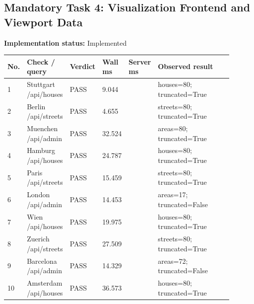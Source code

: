 \documentclass[10pt,a4paper]{article}
\begin{document}
\subsection{Mandatory Task 4: Visualization Frontend and Viewport Data}
\textbf{Implementation status:} Implemented\\
\scriptsize
\begin{longtable}{|P{0.045\linewidth}|P{0.19\linewidth}|P{0.105\linewidth}|P{0.085\linewidth}|P{0.085\linewidth}|P{0.385\linewidth}|}
\hline
\textbf{No.} & \textbf{Check / query} & \textbf{Verdict} & \textbf{Wall ms} & \textbf{Server ms} & \textbf{Observed result}\\ \hline
{} 1 & Stuttgart /api/houses & PASS & 9.044 &  & houses=80; truncated=True\\ \hline
{} 2 & Berlin /api/streets & PASS & 4.655 &  & streets=80; truncated=True\\ \hline
{} 3 & Muenchen /api/admin & PASS & 32.524 &  & areas=80; truncated=True\\ \hline
{} 4 & Hamburg /api/houses & PASS & 24.787 &  & houses=80; truncated=True\\ \hline
{} 5 & Paris /api/streets & PASS & 15.459 &  & streets=80; truncated=True\\ \hline
{} 6 & London /api/admin & PASS & 14.453 &  & areas=17; truncated=False\\ \hline
{} 7 & Wien /api/houses & PASS & 19.975 &  & houses=80; truncated=True\\ \hline
{} 8 & Zuerich /api/streets & PASS & 27.509 &  & streets=80; truncated=True\\ \hline
{} 9 & Barcelona /api/admin & PASS & 14.329 &  & areas=72; truncated=False\\ \hline
{} 10 & Amsterdam /api/houses & PASS & 36.573 &  & houses=80; truncated=True\\ \hline
\end{longtable}
\normalsize
\end{document}
